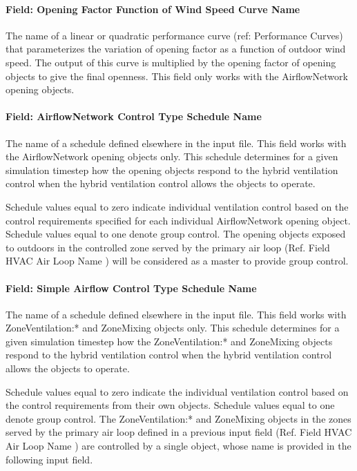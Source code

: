 \paragraph{Field: Opening Factor Function of Wind Speed Curve Name}\label{field-opening-factor-function-of-wind-speed-curve-name}

The name of a linear or quadratic performance curve (ref: Performance Curves) that parameterizes the variation of opening factor as a function of outdoor wind speed. The output of this curve is multiplied by the opening factor of opening objects to give the final openness. This field only works with the AirflowNetwork opening objects.

\paragraph{Field: AirflowNetwork Control Type Schedule Name}\label{field-airflownetwork-control-type-schedule-name}

The name of a schedule defined elsewhere in the input file. This field works with the AirflowNetwork opening objects only. This schedule determines for a given simulation timestep how the opening objects respond to the hybrid ventilation control when the hybrid ventilation control allows the objects to operate.

Schedule values equal to zero indicate individual ventilation control based on the control requirements specified for each individual AirflowNetwork opening object. Schedule values equal to one denote group control. The opening objects exposed to outdoors in the controlled zone served by the primary air loop (Ref. Field HVAC Air Loop Name ) will be considered as a master to provide group control.

\paragraph{Field: Simple Airflow Control Type Schedule Name}\label{field-simple-airflow-control-type-schedule-name}

The name of a schedule defined elsewhere in the input file. This field works with ZoneVentilation:* and ZoneMixing objects only. This schedule determines for a given simulation timestep how the ZoneVentilation:* and ZoneMixing objects respond to the hybrid ventilation control when the hybrid ventilation control allows the objects to operate.

Schedule values equal to zero indicate the individual ventilation control based on the control requirements from their own objects. Schedule values equal to one denote group control. The ZoneVentilation:* and ZoneMixing objects in the zones served by the primary air loop defined in a previous input field (Ref. Field HVAC Air Loop Name ) are controlled by a single object, whose name is provided in the following input field.

